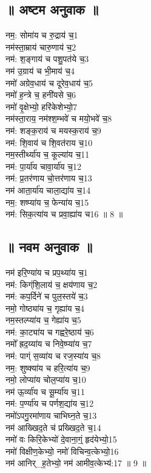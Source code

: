 \subsection{॥ अष्टम अनुवाक ॥}
नम॒: सोमा॑य च रु॒द्राय॑ च॒{\small 1}\\
नम॑स्ता॒म्राय॑ चारु॒णाय॑ च॒{\small 2}\\
नम॑: श॒ङ्गाय॑ च पशु॒पत॑ये च॒{\small 3}\\
नम॑ उ॒ग्राय॑ च भी॒माय॑ च॒{\small 4}\\
नमो॑ अग्रेव॒धाय॑ च दूरेव॒धाय॑ च॒{\small 5}\\
नमो॑ ह॒न्त्रे च॒ हनी॑यसे च॒{\small 6}\\
नमो॑ वृ॒क्षेभ्यो॒ हरि॑केशेभ्यो॒{\small 7}\\
नम॑स्ता॒राय॒ नम॑श्श॒म्भवे॑ च मयो॒भवे॑ च॒{\small 8}\\
नम॑: शङ्क॒राय॑ च मयस्क॒राय॑ च॒{\small 9}\\
नम॑: शि॒वाय॑ च शि॒वत॑राय च॒{\small 10}\\
नम॒स्तीर्थ्या॑य च॒ कूल्या॑य च॒{\small 11}\\
नम॑: पा॒र्या॑य चावा॒र्या॑य च॒{\small 12}\\
नम॑: प्र॒तर॑णाय चो॒त्तर॑णाय च॒{\small 13}\\
नम॑ आता॒र्या॑य चाला॒द्या॑य च॒{\small 14}\\
नम॒: शष्प्या॑य च॒ फेन्या॑य च॒{\small 15}\\
नम॑: सिक॒त्या॑य च प्रवा॒ह्या॑य च{\small 16} ॥ 8 ॥\\
\subsection{॥ नवम अनुवाक ॥}
नम॑ इरि॒ण्या॑य च प्रप॒थ्या॑य च॒{\small 1}\\
नम॑: किग्ंशि॒लाय॑ च॒ क्षय॑णाय च॒{\small 2}\\
नम॑: कप॒र्दिने॑ च पुल॒स्तये॑ च॒{\small 3}\\
नमो॒ गोष्ठ्या॑य च॒ गृह्या॑य च॒{\small 4}\\
नम॒स्तल्प्या॑य च॒ गेह्या॑य च॒{\small 5}\\
नम॑: का॒ट्या॑य च गह्वरे॒ष्ठाय॑ च॒{\small 6}\\
नमो᳚ ह्रद॒य्या॑य च निवे॒ष्प्या॑य च॒{\small 7}\\
नम॑: पाग्ं स॒व्या॑य च रज॒स्या॑य च॒{\small 8}\\
नम॒: शुष्क्या॑य च हरि॒त्या॑य च॒{\small 9}\\
नमो॒ लोप्या॑य चोल॒प्या॑य च॒{\small 10}\\
नम॑ ऊ॒र्व्या॑य च सू॒र्म्या॑य च॒{\small 11}\\
नम॑: प॒र्ण्या॑य च पर्णश॒द्या॑य च॒{\small 12}\\
नमो॑ऽपगु॒रमा॑णाय चाभिघ्न॒ते च॒{\small 13}\\
नम॑ आख्खिद॒ते च॑ प्रख्खिद॒ते च॒{\small 14}\\
नमो॑ वः किरि॒केभ्यो॑ दे॒वाना॒ग्ं॒ हृद॑येभ्यो॒{\small 15}\\
नमो॑ विक्षीण॒केभ्यो॒ नमो॑ विचिन्व॒त्केभ्यो॒{\small 16}\\
नम॑ आनिर्_ह॒तेभ्यो॒ नम॑ आमीव॒त्केभ्य॑:{\small 17} ॥ 9 ॥\\

